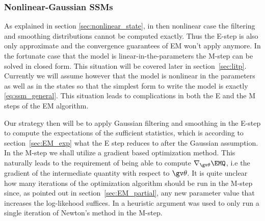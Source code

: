 \subsubsection{Nonlinear-Gaussian SSMs}%

As explained in section \ref{sec:nonlinear_state}, in then nonlinear case
the filtering and smoothing distributions cannot be computed exactly.
Thus the E-step is also only approximate and the convergence
guarantees of EM won't apply anymore. In the fortunate case that the
model is linear-in-the-parameters the M-step can be solved in closed form.
This situation will be covered later in section~\ref{sec:litp}. 
Currently we will assume however that the model is nonlinear in the 
parameters as well as in the states so that the simplest form to write the 
model is exactly \eqref{eq:ssm_general}. This situation leads to complications
in both the E and the M steps of the EM algorithm.

Our strategy then will be to apply Gaussian filtering and smoothing
in the E-step to compute the expectations of the sufficient statistics,
which is according to section~\ref{sec:EM_exp} what the E step reduces
to after the Gaussian assumption. In the M-step
we shall utilize a gradient based optimization method.
This naturally leads to the requirement of being able to compute 
$\nabla_{\Th}\EMQ$, i.e the gradient of the intermediate quantity with respect
to $\Th$. It is quite unclear how many iterations of the optimization algorithm should
be run in the M-step since, as pointed out in section~\ref{sec:EM_partial},
any new parameter value that increases the log-likehood suffices. In \textcite{Lange1995}
a heuristic argument was used to only run a single iteration of Newton's method in the M-step.

